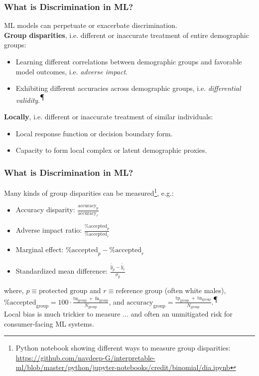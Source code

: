 \documentclass[11pt,
               		aspectratio=169,
               		hyperref={colorlinks}
               		]{beamer}
\begin{document}
		\begin{frame}				
			\frametitle{What is Discrimination in ML?}
			ML models can perpetuate or exacerbate discrimination.\\
			\vspace{10pt}
			\noindent \textbf{Group disparities}, i.e. different or inaccurate treatment of entire demographic groups:\\
			\begin{itemize}
				\item Learning different correlations between demographic groups and favorable model outcomes, i.e. \textit{adverse impact}.
				\item Exhibiting different accuracies across demographic groups, i.e. \textit{differential validity}.\textsuperscript{$\mathparagraph$}
			\end{itemize}
			\vspace{5pt}
			\noindent \textbf{Locally}, i.e. different or inaccurate treatment of similar individuals:\\
			\begin{itemize}
				\item Local response function or decision boundary form. 
				\item Capacity to form local complex or latent demographic proxies.
			\end{itemize}
		\end{frame}
		\begin{frame}				
			\frametitle{What is Discrimination in ML?}
			Many kinds of group disparities can be measured\footnote{\tiny{Python notebook showing different ways to measure group disparities: \url{https://github.com/navdeep-G/interpretable-ml/blob/master/python/jupyter-notebooks/credit/binomial/dia.ipynb}}}, e.g.:\\
			\begin{itemize}
				\item Accuracy disparity: $\frac{\text{accuracy}_p}{\text{accuracy}_r}$
				\item Adverse impact ratio: $\frac{\text{\% accepted}_p }{ \text{\% accepted}_r}$
				\item Marginal effect: $\text{\% accepted}_p - \text{\% accepted}_r$
				\item Standardized mean difference: $\frac{\bar{\hat{y}}_p - \bar{\hat{y}}_r}{\sigma_{\hat{y}}}$
			\end{itemize}
			\noindent where, $p \equiv \text{protected group}$ and $r \equiv \text{reference group}$ (often white males),\\
			\vspace{5pt}
			$\text{\% accepted}_\text{group} = 100 \cdot \frac{\text{tn}_\text{group}~+~\text{fn}_\text{group}}{N_\text{group}}$, and $\text{accuracy}_\text{group} = \frac{\text{tp}_\text{group}~+~\text{tn}_\text{group}}{N_\text{group}}$.\textsuperscript{$\mathparagraph$}\\
			\vspace{10pt}
			Local bias is much trickier to measure ... and often an unmitigated risk for consumer-facing ML systems.
		\end{frame}		
\end{document}

